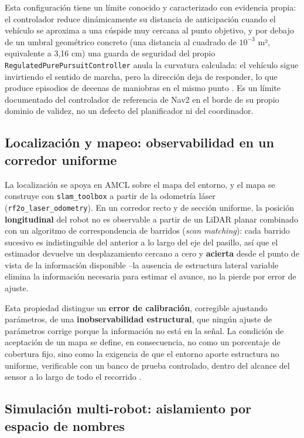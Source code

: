 \documentclass[12pt,letterpaper]{article}
\begin{document}
Esta configuración tiene un límite conocido y caracterizado con evidencia propia: el controlador reduce dinámicamente su distancia de anticipación cuando el vehículo se aproxima a una cúspide muy cercana al punto objetivo, y por debajo de un umbral geométrico concreto (una distancia al cuadrado de $10^{-3}$ m², equivalente a 3,16 cm) una guarda de seguridad del propio \texttt{RegulatedPurePursuitController} anula la curvatura calculada: el vehículo sigue invirtiendo el sentido de marcha, pero la dirección deja de responder, lo que produce episodios de decenas de maniobras en el mismo punto \cite{r12_cuspides}. Es un límite documentado del controlador de referencia de Nav2 en el borde de su propio dominio de validez, no un defecto del planificador ni del coordinador.

\subsection{Localización y mapeo: observabilidad en un corredor uniforme}

La localización se apoya en AMCL sobre el mapa del entorno, y el mapa se construye con \texttt{slam\_toolbox} a partir de la odometría láser (\texttt{rf2o\_laser\_odometry}). En un corredor recto y de sección uniforme, la posición \textbf{longitudinal} del robot no es observable a partir de un LiDAR planar combinado con un algoritmo de correspondencia de barridos (\textit{scan matching}): cada barrido sucesivo es indistinguible del anterior a lo largo del eje del pasillo, así que el estimador devuelve un desplazamiento cercano a cero y \textbf{acierta} desde el punto de vista de la información disponible --la ausencia de estructura lateral variable elimina la información necesaria para estimar el avance, no la pierde por error de ajuste.

Esta propiedad distingue un \textbf{error de calibración}, corregible ajustando parámetros, de una \textbf{inobservabilidad estructural}, que ningún ajuste de parámetros corrige porque la información no está en la señal. La condición de aceptación de un mapa se define, en consecuencia, no como un porcentaje de cobertura fijo, sino como la exigencia de que el entorno aporte estructura no uniforme, verificable con un banco de prueba controlado, dentro del alcance del sensor a lo largo de todo el recorrido \cite{mapeo_pasillo}.

\subsection{Simulación multi-robot: aislamiento por espacio de nombres}
\end{document}
